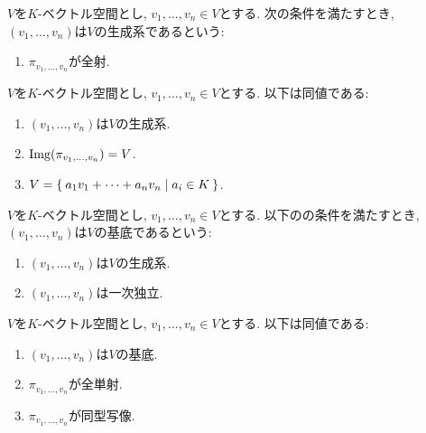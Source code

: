 \begin{definition}
  $V$を$K$-ベクトル空間とし,
  $v_1,\ldots,v_n\in V$とする.
  次の条件を満たすとき,
  $(v_1,\ldots,v_n)$は$V$の生成系であるという:
  \begin{enumerate}
    \item $\pi_{v_1,\ldots,v_n}$が全射.
  \end{enumerate}
\end{definition}
\begin{remark}
  $V$を$K$-ベクトル空間とし,
  $v_1,\ldots,v_n\in V$とする.
  以下は同値である:
  \begin{enumerate}
  \item $(v_1,\ldots,v_n)$は$V$の生成系.
  \item $\operatorname{Img}(\pi_{v_1,\ldots,v_n})=V$.
  \item $V=\Set{a_1v_1+\cdots+a_nv_n|a_i\in K}$.
  \end{enumerate}
\end{remark}


\begin{definition}
  $V$を$K$-ベクトル空間とし,
  $v_1,\ldots,v_n\in V$とする.
  以下のの条件を満たすとき,
  $(v_1,\ldots,v_n)$は$V$の基底であるという:
  \begin{enumerate}
  \item $(v_1,\ldots,v_n)$は$V$の生成系.
  \item $(v_1,\ldots,v_n)$は一次独立.
  \end{enumerate}
\end{definition}
\begin{remark}
  $V$を$K$-ベクトル空間とし,
  $v_1,\ldots,v_n\in V$とする.
  以下は同値である:
  \begin{enumerate}
  \item $(v_1,\ldots,v_n)$は$V$の基底.
  \item $\pi_{v_1,\ldots,v_n}$が全単射.
  \item $\pi_{v_1,\ldots,v_n}$が同型写像.
  \end{enumerate}
\end{remark}

